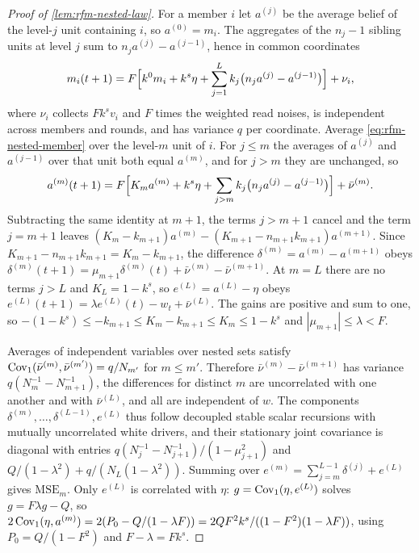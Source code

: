 \begin{proof}[Proof of \cref{lem:rfm-nested-law}]
For a member $i$ let $a^{(j)}$ be the average belief of the level-$j$ unit containing $i$, so $a^{(0)}=m_i$. The aggregates of the $n_j-1$ sibling units at level $j$ sum to $n_ja^{(j)}-a^{(j-1)}$, hence in common coordinates
\begin{equation}\label{eq:rfm-nested-member}
m_i(t+1)=F\Bigl[k^0m_i+k^s\eta+\sum_{j=1}^{L}k_j\bigl(n_ja^{(j)}-a^{(j-1)}\bigr)\Bigr]+\nu_i,
\end{equation}
where $\nu_i$ collects $Fk^sv_i$ and $F$ times the weighted read noises, is independent across members and rounds, and has variance $q$ per coordinate. Average \eqref{eq:rfm-nested-member} over the level-$m$ unit of $i$. For $j\le m$ the averages of $a^{(j)}$ and $a^{(j-1)}$ over that unit both equal $a^{(m)}$, and for $j>m$ they are unchanged, so
\begin{equation*}
a^{(m)}(t+1)=F\Bigl[K_ma^{(m)}+k^s\eta+\sum_{j>m}k_j\bigl(n_ja^{(j)}-a^{(j-1)}\bigr)\Bigr]+\bar\nu^{(m)}.
\end{equation*}
Subtracting the same identity at $m+1$, the terms $j>m+1$ cancel and the term $j=m+1$ leaves $(K_m-k_{m+1})a^{(m)}-(K_{m+1}-n_{m+1}k_{m+1})a^{(m+1)}$. Since $K_{m+1}-n_{m+1}k_{m+1}=K_m-k_{m+1}$, the difference $\delta^{(m)}=a^{(m)}-a^{(m+1)}$ obeys $\delta^{(m)}(t+1)=\mu_{m+1}\delta^{(m)}(t)+\bar\nu^{(m)}-\bar\nu^{(m+1)}$. At $m=L$ there are no terms $j>L$ and $K_L=1-k^s$, so $e^{(L)}=a^{(L)}-\eta$ obeys $e^{(L)}(t+1)=\lambda e^{(L)}(t)-w_t+\bar\nu^{(L)}$. The gains are positive and sum to one, so $-(1-k^s)\le-k_{m+1}\le K_m-k_{m+1}\le K_m\le1-k^s$ and $|\mu_{m+1}|\le\lambda<F$.

Averages of independent variables over nested sets satisfy $\operatorname{Cov}_1(\bar\nu^{(m)},\bar\nu^{(m')})=q/N_{m'}$ for $m\le m'$. Therefore $\bar\nu^{(m)}-\bar\nu^{(m+1)}$ has variance $q(N_m^{-1}-N_{m+1}^{-1})$, the differences for distinct $m$ are uncorrelated with one another and with $\bar\nu^{(L)}$, and all are independent of $w$. The components $\delta^{(m)},\dots,\delta^{(L-1)},e^{(L)}$ thus follow decoupled stable scalar recursions with mutually uncorrelated white drivers, and their stationary joint covariance is diagonal with entries $q(N_j^{-1}-N_{j+1}^{-1})/(1-\mu_{j+1}^2)$ and $Q/(1-\lambda^2)+q/(N_L(1-\lambda^2))$. Summing over $e^{(m)}=\sum_{j=m}^{L-1}\delta^{(j)}+e^{(L)}$ gives $\mathrm{MSE}_m$. Only $e^{(L)}$ is correlated with $\eta$: $g=\operatorname{Cov}_1(\eta,e^{(L)})$ solves $g=F\lambda g-Q$, so $2\operatorname{Cov}_1(\eta,a^{(m)})=2(P_0-Q/(1-\lambda F))=2QF^2k^s/((1-F^2)(1-\lambda F))$, using $P_0=Q/(1-F^2)$ and $F-\lambda=Fk^s$.


\end{proof}

